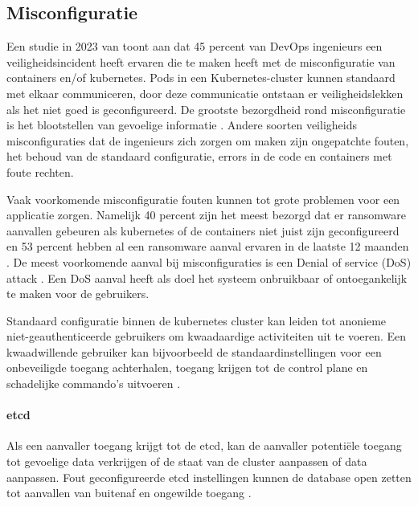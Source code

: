 \subsection{Misconfiguratie}

Een studie in 2023 van \textcite{red-hat-2023} toont aan dat 45 percent van DevOps ingenieurs een veiligheidsincident heeft ervaren die te maken heeft met de misconfiguratie van containers en/of kubernetes. Pods in een Kubernetes-cluster kunnen standaard met elkaar communiceren, door deze communicatie ontstaan er veiligheidslekken als het niet goed is geconfigureerd. De grootste bezorgdheid rond misconfiguratie is het blootstellen van gevoelige informatie \autocite{red-hat-2023}. Andere soorten veiligheids misconfiguraties dat de ingenieurs zich zorgen om maken zijn ongepatchte fouten, het behoud van de standaard configuratie, errors in de code en containers met foute rechten. \newline

Vaak voorkomende misconfiguratie fouten kunnen tot grote problemen voor een applicatie zorgen. Namelijk 40 percent zijn het meest bezorgd dat er ransomware aanvallen gebeuren als kubernetes of de containers niet juist zijn geconfigureerd en 53 percent hebben al een ransomware aanval ervaren in de laatste 12 maanden \autocite{red-hat-2023}. De meest voorkomende aanval bij misconfiguraties is een Denial of service (DoS) attack \autocite{red-hat-2023}. Een DoS aanval heeft als doel het systeem onbruikbaar of ontoegankelijk te maken voor de gebruikers. \newline

Standaard configuratie binnen de kubernetes cluster kan leiden tot anonieme niet-geauthenticeerde gebruikers om kwaadaardige activiteiten uit te voeren. Een kwaadwillende gebruiker kan bijvoorbeeld de standaardinstellingen voor een onbeveiligde toegang achterhalen, toegang krijgen tot de control plane en schadelijke commando's uitvoeren \autocite{shamim2020xi}.

\paragraph{etcd}
Als een aanvaller toegang krijgt tot de etcd, kan de aanvaller potentiële toegang tot gevoelige data verkrijgen of de staat van de cluster aanpassen of data aanpassen. Fout geconfigureerde etcd instellingen kunnen de database open zetten tot aanvallen van buitenaf en ongewilde toegang \autocite{KubernetesDocs-2023}.



